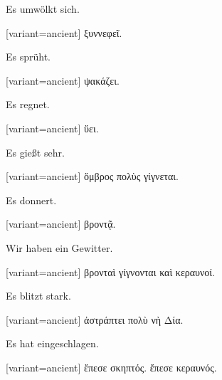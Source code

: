 Es umwölkt sich.

\switchcolumn

\begin{greek}[variant=ancient]%
ξυννεφεῖ.

\end{greek}%
\switchcolumn*

Es sprüht.

\switchcolumn

\begin{greek}[variant=ancient]%
ψακάζει.

\end{greek}%
\switchcolumn*

Es regnet.

\switchcolumn

\begin{greek}[variant=ancient]%
ὕει.

\end{greek}%
\switchcolumn*

Es gießt sehr.

\switchcolumn

\begin{greek}[variant=ancient]%
ὄμβρος πολὺς γίγνεται.

\end{greek}%
\switchcolumn*

Es donnert.

\switchcolumn

\begin{greek}[variant=ancient]%
βροντᾷ.

\end{greek}%
\switchcolumn*

Wir haben ein Gewitter.

\switchcolumn

\begin{greek}[variant=ancient]%
βρονταὶ γίγνονται καὶ κεραυνοί.

\end{greek}%
\switchcolumn*

Es blitzt stark.

\switchcolumn

\begin{greek}[variant=ancient]%
ἀστράπτει πολὺ νὴ Δία.

\end{greek}%
\switchcolumn*

Es hat eingeschlagen.

\switchcolumn

\begin{greek}[variant=ancient]%
ἔπεσε σκηπτός. ἔπεσε κεραυνός.

\end{greek}%
\switchcolumn*


